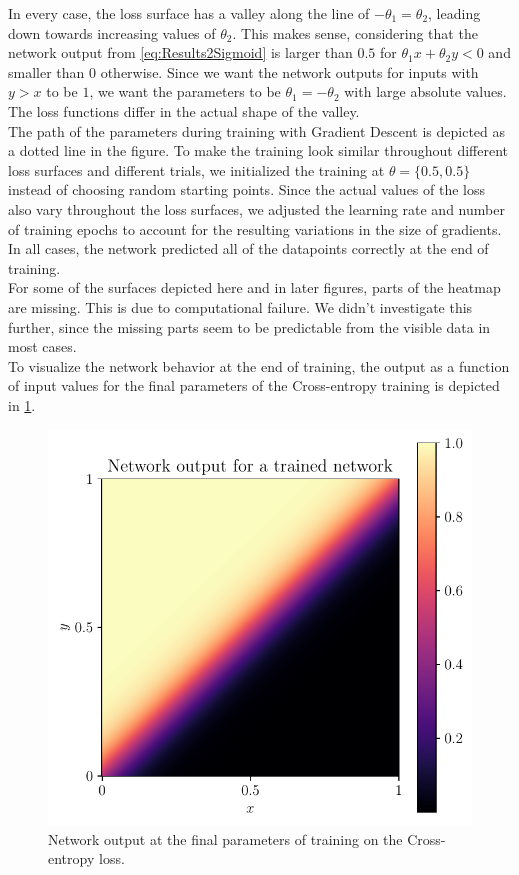 In every case, the loss surface has a valley along the line of $-\theta_1 = \theta_2$, leading down towards increasing values of  $\theta_2$. This makes sense, considering that the network output from \cref{eq:Results2Sigmoid} is larger than $0.5$ for $\theta_1x + \theta_2y < 0$ and smaller than $0$ otherwise. Since we want the network outputs for inputs with $y>x$ to be $1$, we want the parameters to be $\theta_1 = - \theta_2$ with large absolute values. The loss functions differ in the actual shape of the valley.\\
The path of the parameters during training with Gradient Descent is depicted as a dotted line in the figure. To make the training look similar throughout different loss surfaces and different trials, we initialized the training at $\theta = \{0.5, 0.5\}$ instead of choosing random starting points. Since the actual values of the loss also vary throughout the loss surfaces, we adjusted the learning rate and number of training epochs to account for the resulting variations in the size of gradients. In all cases, the network predicted all of the datapoints correctly at the end of training.\\
For some of the surfaces depicted here and in later figures, parts of the heatmap are missing. This is due to computational failure. We didn't investigate this further, since the missing parts seem to be predictable from the visible data in most cases.\\
To visualize the network behavior at the end of training, the output as a function of input values for the final parameters of the Cross-entropy training is depicted in \cref{fig:Results2NetworkOutput}.
\begin{figure}
	\centering
	\includegraphics{Experiment2/plots/Network_output.pdf}
	\caption{Network output at the final parameters of training on the Cross-entropy loss.}
	\label{fig:Results2NetworkOutput}	
\end{figure}
